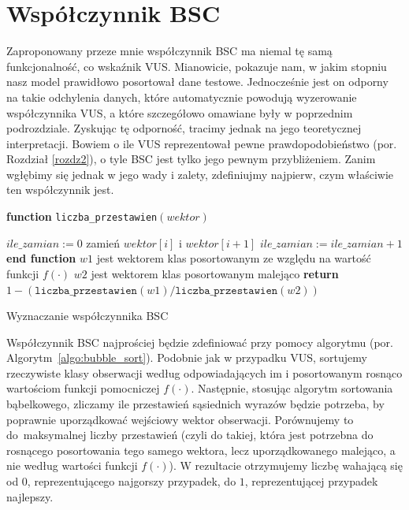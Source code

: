 \documentclass{mini}
\newlength\myindent
\newcommand\bindent{%
  \begingroup
  \setlength{\itemindent}{\myindent}
  \addtolength{\algorithmicindent}{\myindent}
}
\newcommand\eindent{\endgroup}
\begin{document}
\section{Współczynnik BSC}

Zaproponowany przeze mnie współczynnik BSC ma niemal tę samą funkcjonalność, co wskaźnik VUS. Mianowicie, pokazuje nam, w jakim stopniu nasz model prawidłowo posortował dane testowe. Jednocześnie jest on odporny na takie odchylenia danych, które automatycznie powodują wyzerowanie współczynnika VUS, a które szczegółowo omawiane były w poprzednim podrozdziale. Zyskując tę odporność, tracimy jednak na jego teoretycznej interpretacji. Bowiem o ile VUS reprezentował pewne prawdopodobieństwo (por. Rozdział \ref{rozdz2}), o tyle BSC jest tylko jego pewnym przybliżeniem. Zanim wgłębimy się jednak w jego wady i zalety, zdefiniujmy najpierw, czym właściwie ten współczynnik jest.  

\begin{algorithm}
\begin{algorithmic}
\STATE
\STATE \textbf{function} \texttt{liczba\_przestawien}$(wektor)$
\bindent
\STATE $ile\_zamian := 0$ 
            \STATE zamień $wektor[i]$ i $wektor[i+1]$
            \STATE $ile\_zamian := ile\_zamian+1$
        \ENDIF
    \ENDFOR
\ENDFOR
\eindent
\STATE \textbf{end function}
\STATE
\STATE $w1$ jest wektorem klas posortowanym ze względu na wartość funkcji $f(\cdot)$
\STATE $w2$ jest wektorem klas posortowanym malejąco
\STATE
\STATE \textbf{return} $1-(\texttt{liczba\_przestawien}(w1)/\texttt{liczba\_przestawien}(w2))$
\end{algorithmic}
\caption{Wyznaczanie współczynnika BSC}
\label{algo:bubble_sort}
\end{algorithm}

Współczynnik BSC najprościej będzie zdefiniować przy pomocy algorytmu (por. Algorytm~\ref{algo:bubble_sort}). Podobnie jak w przypadku VUS, sortujemy rzeczywiste klasy obserwacji według odpowiadających im i posortowanym rosnąco wartościom funkcji pomocniczej $f(\cdot)$. Następnie, stosując algorytm sortowania bąbelkowego, zliczamy ile przestawień sąsiednich wyrazów będzie potrzeba, by poprawnie uporządkować wejściowy wektor obserwacji. Porównujemy to do~maksymalnej liczby przestawień (czyli do takiej, która jest potrzebna do rosnącego posortowania tego samego wektora, lecz uporządkowanego malejąco, a nie według wartości funkcji $f(\cdot)$). W rezultacie otrzymujemy liczbę wahającą się od $0$, reprezentującego najgorszy przypadek, do $1$, reprezentującej przypadek najlepszy. 
\end{document}
